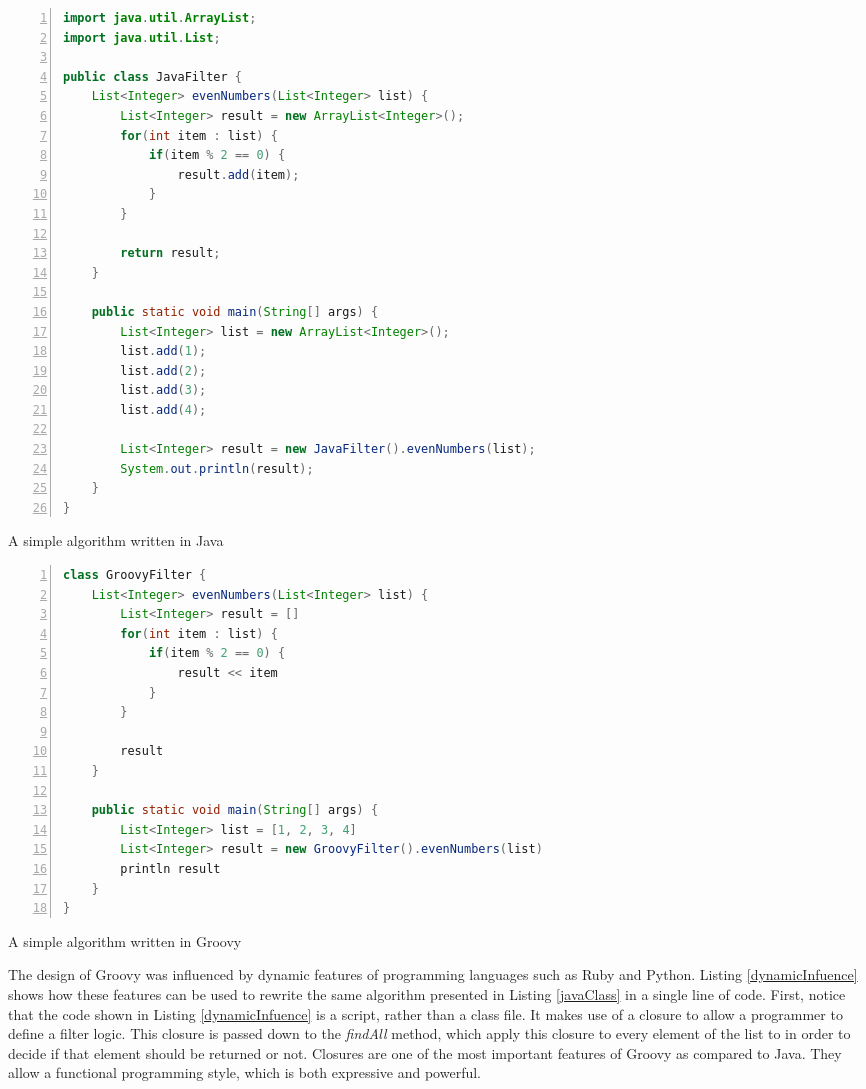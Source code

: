 \documentclass[preprint]{sigplanconf}
\begin{document}
\begin{Listing}[ht]
\begin{lstlisting}[language=Java,tabsize=2,breaklines=true,numbers=left]
import java.util.ArrayList;
import java.util.List;

public class JavaFilter {
	List<Integer> evenNumbers(List<Integer> list) {
		List<Integer> result = new ArrayList<Integer>();
		for(int item : list) {
			if(item % 2 == 0) {
				result.add(item);
			}
		}

		return result;
	}

	public static void main(String[] args) {
		List<Integer> list = new ArrayList<Integer>();
		list.add(1);
		list.add(2);
		list.add(3);
		list.add(4);

		List<Integer> result = new JavaFilter().evenNumbers(list);
		System.out.println(result);
	}
}
\end{lstlisting}
\caption{A simple algorithm written in Java}
\label{javaClass}
\end{Listing}

\begin{Listing}[ht]
\begin{lstlisting}[language=Java,tabsize=2,breaklines=true,numbers=left]
class GroovyFilter {
	List<Integer> evenNumbers(List<Integer> list) {
		List<Integer> result = []
		for(int item : list) {
			if(item % 2 == 0) {
				result << item
			}
		}

		result
	}

	public static void main(String[] args) {
		List<Integer> list = [1, 2, 3, 4]
		List<Integer> result = new GroovyFilter().evenNumbers(list)
		println result
	}
}
\end{lstlisting}
\caption{A simple algorithm written in Groovy}
\label{groovyClass}
\end{Listing}

The design of Groovy was influenced by dynamic features of programming languages such as Ruby and Python.
Listing \ref{dynamicInfuence} shows how these features can be used to rewrite the same algorithm presented in Listing \ref{javaClass} in a single line of code. 
First, notice that the code shown in Listing \ref{dynamicInfuence}  is a script, rather than a class file.
It makes use of a closure to allow a programmer to define a filter logic.
This closure is passed down to the \emph{findAll} method, which  apply this closure to every element of the list to in order to decide if that element should be returned or not.
Closures are one of the most important features of Groovy as compared to Java.
They allow a functional programming style, which is both expressive and powerful.
\end{document}
